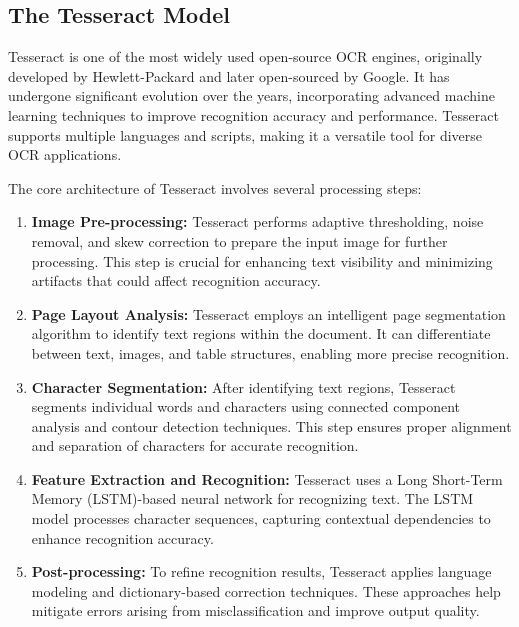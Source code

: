 \subsection{The Tesseract Model}

Tesseract is one of the most widely used open-source OCR engines, originally developed by Hewlett-Packard and later open-sourced by Google. It has undergone significant evolution over the years, incorporating advanced machine learning techniques to improve recognition accuracy and performance. Tesseract supports multiple languages and scripts, making it a versatile tool for diverse OCR applications.

The core architecture of Tesseract involves several processing steps:

\begin{enumerate}
    \item \textbf{Image Pre-processing:} Tesseract performs adaptive thresholding, noise removal, and skew correction to prepare the input image for further processing. This step is crucial for enhancing text visibility and minimizing artifacts that could affect recognition accuracy.
    
    \item \textbf{Page Layout Analysis:} Tesseract employs an intelligent page segmentation algorithm to identify text regions within the document. It can differentiate between text, images, and table structures, enabling more precise recognition.
    
    \item \textbf{Character Segmentation:} After identifying text regions, Tesseract segments individual words and characters using connected component analysis and contour detection techniques. This step ensures proper alignment and separation of characters for accurate recognition.
    
    \item \textbf{Feature Extraction and Recognition:} Tesseract uses a Long Short-Term Memory (LSTM)-based neural network for recognizing text. The LSTM model processes character sequences, capturing contextual dependencies to enhance recognition accuracy.
    
    \item \textbf{Post-processing:} To refine recognition results, Tesseract applies language modeling and dictionary-based correction techniques. These approaches help mitigate errors arising from misclassification and improve output quality.
\end{enumerate}

